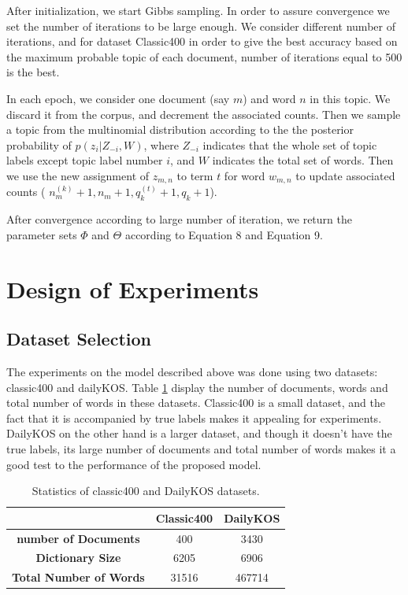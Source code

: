 \documentclass[twoside,12pt]{article}
\begin{document}
After initialization, we start Gibbs sampling. In order to assure convergence we set the number of iterations to be large enough. We consider different number of iterations, and for dataset Classic400 in order to give the best accuracy based on the maximum probable topic of each document, number of iterations equal to 500 is the best. 

In each epoch, we consider one document (say $m$) and word $n$ in this topic. We discard it from the corpus, and decrement the associated counts. Then we sample a topic from the multinomial distribution according to the the posterior probability of $p(z_i|Z_{-i},W)$, where $Z_{-i}$ indicates that the whole set of topic labels except topic label number $i$, and $W$ indicates the total set of words. Then we use the new assignment of $z_{m,n}$ to term $t$ for word $w_{m,n}$ to update associated counts ( $n_m^{(k)}+1,n_m+1,q_k^{(t)}+1,q_k+1$). 

After convergence according to large number of iteration, we return the parameter sets $\Phi$ and $\Theta$ according to Equation 8 and Equation 9.


\section{Design of Experiments}

\subsection{Dataset Selection}
The experiments on the model described above was done using two datasets: classic400 and dailyKOS. Table \ref{tableDatasetStats} display the number of documents, words and total number of words in these datasets. Classic400 is a small dataset, and the fact that it is accompanied by true labels makes it appealing for experiments. DailyKOS on the other hand is a larger dataset, and though it doesn't have the true labels, its large number of documents and total number of words makes it a good test to the performance of the proposed model. 


\begin{table}
\vspace{-2cm}
\center
\begin{tabular}{|c|c|c|}
\hline
 & \textbf{Classic400} & \textbf{DailyKOS} \\
 \hline
\textbf{ number of Documents} & 400 & 3430 \\
\textbf{ Dictionary Size} & 6205 & 6906 \\
\textbf{ Total Number of Words} & 31516 & 467714\\
 \hline
\end{tabular}
\caption{Statistics of classic400 and DailyKOS datasets.}
\label{tableDatasetStats}
\end{table}
\end{document}
